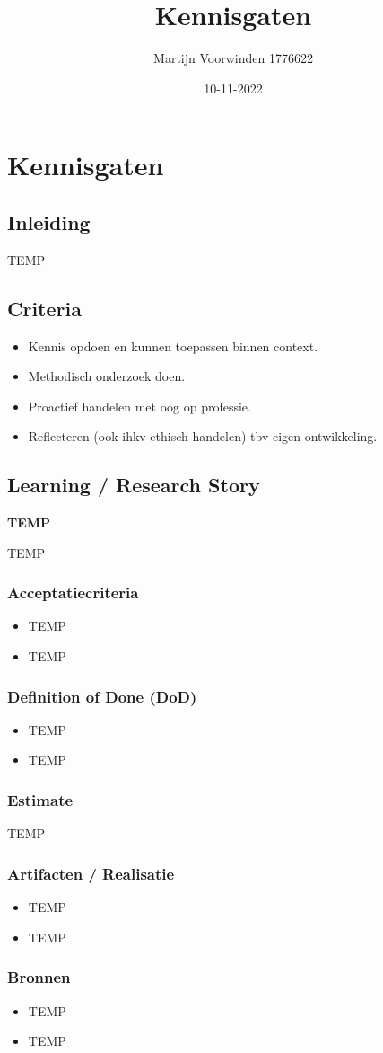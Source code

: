 \documentclass{article}
\title{Kennisgaten}
\author{Martijn Voorwinden 1776622}
\date{10-11-2022}
\newcommand{\ls}[8]{
    \maketitle
    \section*{Kennisgaten}
    \subsection*{Inleiding}
    #1
    \subsection*{Criteria}
    \begin{itemize}
        \item Kennis opdoen en kunnen toepassen binnen context.
        \item Methodisch onderzoek doen.
        \item Proactief handelen met oog op professie.
        \item Reflecteren (ook ihkv ethisch handelen) tbv eigen ontwikkeling.
    \end{itemize}
    \subsection*{Learning / Research Story}
    \textbf{#2}
    #3
    \subsubsection*{Acceptatiecriteria}
    #4
    \subsubsection*{Definition of Done (DoD)}
    #5
    \subsubsection*{Estimate}
    #6
    \subsubsection*{Artifacten / Realisatie}
    #7
    \subsubsection*{Bronnen}
    #8
}
\begin{document}
    \ls
    {
        TEMP
    }
    {
        TEMP
    }
    {
        TEMP
    }
    {
        \begin{itemize}
            \item TEMP
            \item TEMP
        \end{itemize}
    }
    {
        \begin{itemize}
            \item TEMP
            \item TEMP
        \end{itemize}
    }
    {
        TEMP
    }
    {
        \begin{itemize}
            \item TEMP
            \item TEMP
        \end{itemize}
    }
    {
        \begin{itemize}
            \item TEMP
            \item TEMP
        \end{itemize}
    }
\end{document}
